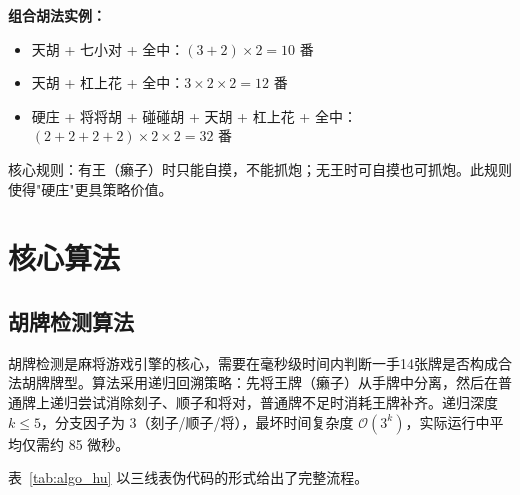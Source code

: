 \documentclass[11pt,a4paper]{article}
\begin{document}
\textbf{组合胡法实例：}
\begin{itemize}[nosep]
  \item 天胡 + 七小对 + 全中：$(3+2)\times 2 = 10$ 番
  \item 天胡 + 杠上花 + 全中：$3\times 2\times 2 = 12$ 番
  \item 硬庄 + 将将胡 + 碰碰胡 + 天胡 + 杠上花 + 全中：$(2+2+2+2)\times 2\times 2 = 32$ 番
\end{itemize}

核心规则：有王（癞子）时只能自摸，不能抓炮；无王时可自摸也可抓炮。此规则使得"硬庄"更具策略价值。

\newpage
\section{核心算法}

\subsection{胡牌检测算法}

胡牌检测是麻将游戏引擎的核心，需要在毫秒级时间内判断一手14张牌是否构成合法胡牌牌型。算法采用递归回溯策略：先将王牌（癞子）从手牌中分离，然后在普通牌上递归尝试消除刻子、顺子和将对，普通牌不足时消耗王牌补齐。递归深度 $k\leq 5$，分支因子为 3（刻子/顺子/将），最坏时间复杂度 $\mathcal{O}(3^k)$，实际运行中平均仅需约 85 微秒。

表~\ref{tab:algo_hu} 以三线表伪代码的形式给出了完整流程。
\end{document}

